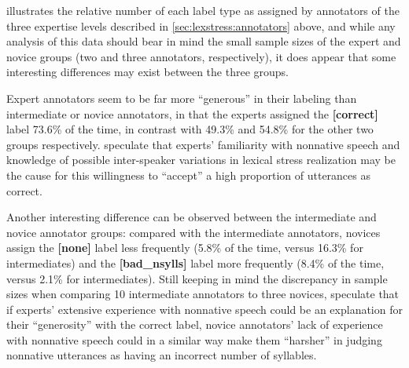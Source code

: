 			 illustrates the relative number of each label type as assigned by annotators of the three expertise levels described in \cref{sec:lexstress:annotators} above, and while any analysis of this data should bear in mind the small sample sizes of the expert and novice groups (two and three annotators, respectively), it does appear that some interesting differences may exist between the three groups. 
			
			Expert annotators seem to be far more ``generous'' in their labeling than intermediate or novice annotators, in that the experts assigned the \textbf{[correct]} label 73.6\% of the time, in contrast with 49.3\% and 54.8\% for the other two groups respectively.  speculate that experts' familiarity with nonnative speech and knowledge of possible inter-speaker variations in lexical stress realization may be the cause for this willingness to ``accept'' a high proportion of utterances as correct. 
			
			Another interesting difference can be observed between the intermediate and novice annotator groups: compared with the intermediate annotators, novices assign the \textbf{[none]} label less frequently (5.8\% of the time, versus 16.3\% for intermediates) and the \textbf{[bad\_nsylls]} label more frequently (8.4\% of the time, versus 2.1\% for intermediates). Still keeping in mind the discrepancy in sample sizes when comparing 10 intermediate annotators to three novices,  speculate that if experts' extensive experience with nonnative speech could be an explanation for their ``generosity'' with the correct label, novice annotators' lack of experience with nonnative speech could in a similar way make them ``harsher'' in judging nonnative utterances as having an incorrect number of syllables. %
			
			
